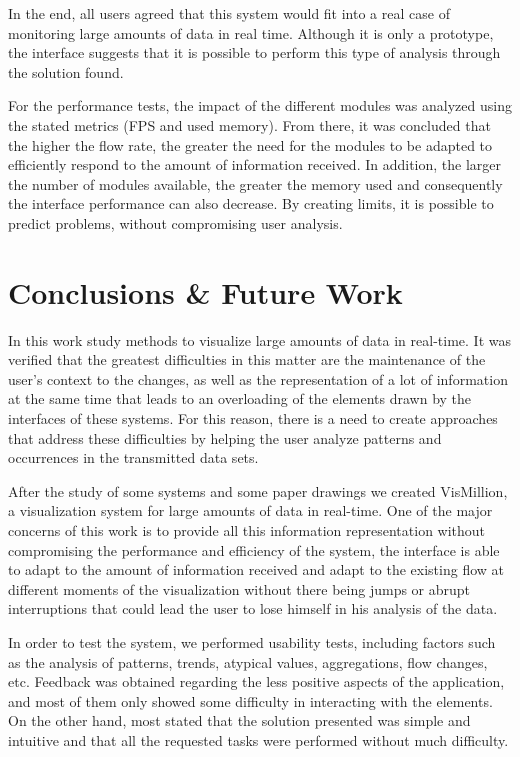 \documentclass[letterpaper, 10 pt, conference]{ieeeconf}  %
\begin{document}
In the end, all users agreed that this system would fit into a real case of monitoring large amounts of data in real time. Although it is only a prototype, the interface suggests that it is possible to perform this type of analysis through the solution found.

For the performance tests, the impact of the different modules was analyzed using the stated metrics (FPS and used memory). From there, it was concluded that the higher the flow rate, the greater the need for the modules to be adapted to efficiently respond to the amount of information received. In addition, the larger the number of modules available, the greater the memory used and consequently the interface performance can also decrease. By creating limits, it is possible to predict problems, without compromising user analysis.


\section{Conclusions \& Future Work}
\label{section:conclusions}
In this work study methods to visualize large amounts of data in real-time. It was verified that the greatest difficulties in this matter are the maintenance of the user's context to the changes, as well as the representation of a lot of information at the same time that leads to an overloading of the elements drawn by the interfaces of these systems. For this reason, there is a need to create approaches that address these difficulties by helping the user analyze patterns and occurrences in the transmitted data sets.

After the study of some systems and some paper drawings we created VisMillion, a visualization system for large amounts of data in real-time.  One of the major concerns of this work is to provide all this information representation without compromising the performance and efficiency of the system, the interface is able to adapt to the amount of information received and adapt to the existing flow at different moments of the visualization without there being jumps or abrupt interruptions that could lead the user to lose himself in his analysis of the data.

In order to test the system, we performed usability tests, including factors such as the analysis of patterns, trends, atypical values, aggregations, flow changes, etc. Feedback was obtained regarding the less positive aspects of the application, and most of them only showed some difficulty in interacting with the elements. On the other hand, most stated that the solution presented was simple and intuitive and that all the requested tasks were performed without much difficulty.
\end{document}
